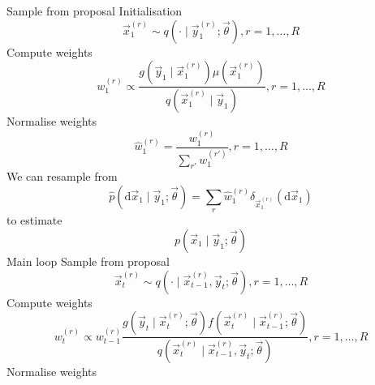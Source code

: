     \begin{algorithmbis}\label{alg:sis}
        \begin{algorithmic}[1]
            \State Sample from proposal \Comment Initialisation
                \begin{equation}
                    \vec x_1^{(r)} \sim q\left(\cdot \mid \vec y_1^{(r)}; \vec \theta\right), r = 1, \dotsc, R
                \end{equation}
            \State Compute weights
                \begin{equation}
                    w_1^{(r)} \propto \frac{g\left(\vec y_1 \mid \vec x^{(r)}_1\right) \mu\left(\vec x^{(r)}_1\right)}{q\left(\vec x_1^{(r)} \mid \vec y_1\right)}, r = 1, \dotsc, R
                \end{equation}
            \State Normalise weights
                \begin{equation}
                    \hat w_1^{(r)} = \frac{w_1^{(r)}}{\sum_{r'} w_1^{(r')}}, r = 1, \dotsc, R
                \end{equation}
            \State We can resample from 
                \begin{equation}
                    \hat p(\mathrm d \vec x_1 \mid \vec y_1; \vec \theta) = \sum_r \hat w_1^{(r)} \delta_{\vec x_1^{(r)}}(\mathrm d\vec x_1)
                \end{equation}
                to estimate
                \begin{equation}
                    p(\vec x_1 \mid \vec y_1; \vec \theta)
                \end{equation}
             \Comment Main loop
                \State Sample from proposal
                    \begin{equation}
                        \vec x_t^{(r)} \sim q\left(\cdot \mid \vec x_{t - 1}^{(r)}, \vec y_t; \vec \theta \right), r = 1, \dotsc, R
                    \end{equation}
                \State Compute weights
                    \begin{equation}
                        w_t^{(r)} \propto w_{t - 1}^{(r)} \frac{g\left(\vec y_t \mid \vec x_t^{(r)}; \vec \theta\right) f\left(\vec x_t^{(r)} \mid \vec x_{t - 1}^{(r)}; \vec \theta \right)}{q\left(\vec x_t^{(r)} \mid \vec x_{t - 1}^{(r)}, \vec y_t; \vec \theta \right)}, r = 1, \dotsc, R
                    \end{equation}
                \State Normalise weights
                    \begin{equation}

\end{equation}
\end{algorithmic}
\end{algorithmbis}
